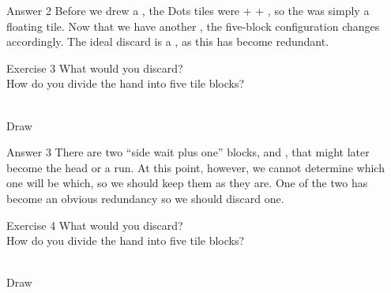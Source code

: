 \bigskip
\begin{itembox}[r]{Answer 2}
\emj
Before we drew a {\large{}}, the Dots tiles were {\large{} +  + }, so the {\large{}} was simply a floating tile. Now that we have another {\large{}}, the five-block configuration changes accordingly. The ideal discard is a {\large{}}, as this has become redundant.
\end{itembox}

\vfill

\begin{itembox}[l]{Exercise 3}
What would you discard? \\
\vsp
How do you divide the hand into five tile blocks? 

\bp
{}~\\
\hspace{290pt}\footnotesize{Draw}
\ep
\end{itembox}


\newpage

\begin{itembox}[r]{Answer 3}
\emj
There are two ``side wait plus one'' blocks, {\large{}} and {\large{}}, that might later become the head or a run. At this point, however, we cannot determine which one will be which, so we should keep them as they are. 
One of the two {\large{}} has become an obvious redundancy so we should discard one. 
\end{itembox}

\vfill

\begin{itembox}[l]{Exercise 4}
What would you discard? \\
\vsp
How do you divide the hand into five tile blocks? 

\bp
{}\bei~\\
\hspace{290pt}\footnotesize{Draw}
\ep
\end{itembox}


